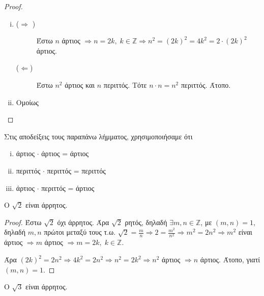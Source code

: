 \begin{proof}
\item {}
  \begin{enumerate}[(i)]
    \item 
      \begin{description}
        \item [($ \Rightarrow $ )] 
          Έστω $ n $ άρτιος $ \Rightarrow n =2k, \; k \in \mathbb{Z} 
          \Rightarrow n^{2} = (2k)^{2} = 4k^{2} = 2\cdot (2k)^{2} $ άρτιος. 
        \item [($ \Leftarrow $)] Έστω $ n^{2} $ άρτιος και $n$ περιττός. Τότε 
          $ n \cdot n = n^{2} $ περιττός. Άτοπο.
      \end{description}

    \item Ομοίως
  \end{enumerate}
\end{proof}

\begin{rem}
  Στις αποδείξεις τους παραπάνω λήμματος, χρησιμοποιήσαμε ότι 
  \begin{enumerate}[(i)]
    \item άρτιος $ \cdot $ άρτιος = άρτιος
    \item περιττός $ \cdot $ περιττός = περιττός
    \item άρτιος $ \cdot $ περιττός = άρτιος
  \end{enumerate}
\end{rem}

\begin{mybox2}
  \begin{thm}
    Ο $ \sqrt{2} $ είναι άρρητος.
  \end{thm}
\end{mybox2}

\begin{proof}
  Έστω $ \sqrt{2} $ όχι άρρητος. Άρα $ \sqrt{2} $ ρητός, δηλαδή $ \exists m,n 
  \in \mathbb{Z} $, με $ (m,n)=1 $, δηλαδή $ m,n $ πρώτοι μεταξύ τους
  τ.ω. $ \sqrt{2} = \frac{m}{n} \Rightarrow 2 = \frac{m^{2}}{n^{2}} \Rightarrow 
  m^{2} = 2n^{2} \Rightarrow m^{2}$ είναι άρτιος $ \Rightarrow m $ άρτιος 
  $ \Rightarrow m = 2k, \; k \in \mathbb{Z}$. 

  Άρα $ (2k)^{2} = 2n^{2} \Rightarrow 4k^{2}=2n^{2} \Rightarrow n^{2} = 2k^{2} 
  \Rightarrow n^{2} $ άρτιος $ \Rightarrow n $ άρτιος. Άτοπο, γιατί $ (m,n)=1 $.
\end{proof}

\begin{example}
  Ο $ \sqrt{3} $ είναι άρρητος.
\end{example}

